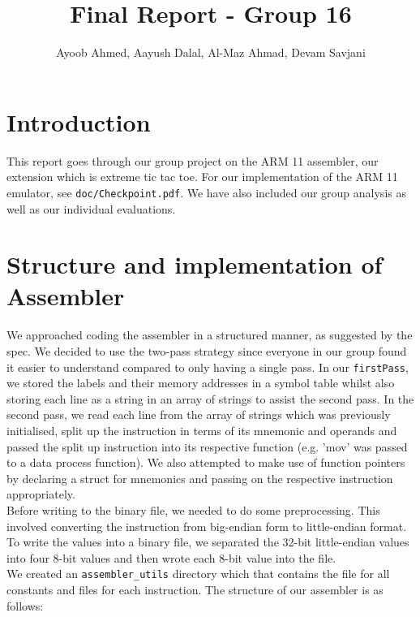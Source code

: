 \documentclass[10pt]{article}
\begin{document}
\title{\vspace{-2cm}Final Report - Group 16}
\author{Ayoob Ahmed, Aayush Dalal, Al-Maz Ahmad, Devam Savjani}


\maketitle
\section{Introduction}
This report goes through our group project on the ARM 11 assembler, our extension which is extreme tic tac toe. For our implementation of the ARM 11 emulator, see {\tt{doc/Checkpoint.pdf}}. We have also included our group analysis as well as our individual evaluations.

\section{Structure and implementation of Assembler}
We approached coding the assembler in a structured manner, as suggested by the spec. We decided to use the two-pass strategy since everyone in our group found it easier to understand compared to only having a single pass. In our {\tt{firstPass}}, we stored the labels and their memory addresses in a symbol table whilst also storing each line as a string in an array of strings to assist the second pass. In the second pass, we read each line from the array of strings which was previously initialised, split up the instruction in terms of its mnemonic and operands and passed the split up instruction into its respective function (e.g. 'mov' was passed to a data process function). We also attempted to make use of function pointers by declaring a struct for mnemonics and passing on the respective instruction appropriately.
\\Before writing to the binary file, we needed to do some preprocessing. This involved converting the instruction from big-endian form to little-endian format. To write the values into a binary file, we separated the 32-bit little-endian values into four 8-bit values and then wrote each 8-bit value into the file.
\\ We created an {\tt{assembler\_utils}} directory which that contains the file for all constants and files for each instruction. The structure of our assembler is as follows:
\end{document}
